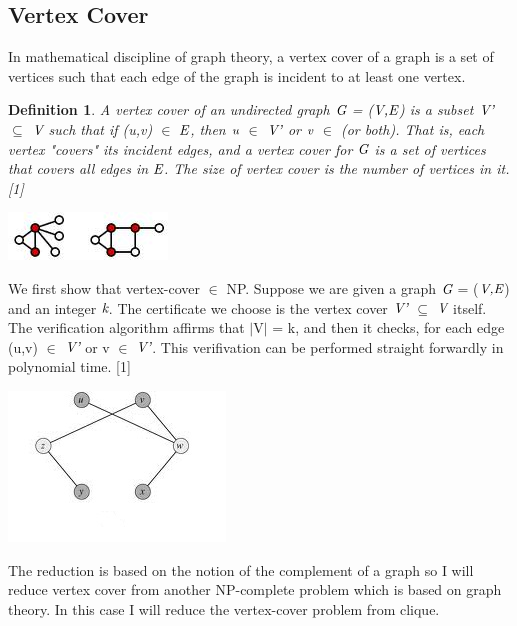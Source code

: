 \documentclass[a4paper]{report}
\newtheorem{defi}{Definition}
\begin{document}
\subsection{Vertex Cover }
In mathematical discipline of graph theory, a vertex cover of a graph is a set of vertices such that each edge of the graph is incident to at least one vertex.

\begin{defi}
A vertex cover of an undirected graph $\emph{G}$ = ($\emph{V,E}$) is a subset $\emph{V'}$ $\subseteq$ $\emph{V}$ such that if (u,v) $\in$ $\emph{E}$, then $\emph{u}$ $\in$ $\emph{V'}$ or $\emph{v}$ $\in$ (or both). That is, each vertex "covers" its incident edges, and a vertex cover for $\emph{G}$ is a set of vertices that covers all edges in $\emph{E}$. The size of vertex cover is the number of vertices in it. [1]
\end{defi}

\begin{center}
\includegraphics[scale=1.11]{vertex1.png}
\end{center}

We first show that vertex-cover $\in$ NP. Suppose we are given a graph $\emph{G}$ = ($\emph{V,E}$) and an integer $\emph{k}$. The certificate we choose is the vertex cover $\emph{V'}$ $\subseteq$ $\emph{V}$ itself. The verification algorithm affirms that $\vert$V$\vert$ = k, and then it checks, for each edge (u,v) $\in$ $\emph{V'}$ or v $\in$ $\emph{V'}$. This verifivation can be performed straight forwardly in polynomial time. [1]

\begin{center}
\includegraphics[scale=0.90]{vertex.png}
\end{center}

The reduction is based on the notion of the complement of a graph so I will reduce vertex cover from another NP-complete problem which is based on graph theory. In this case I will reduce the vertex-cover problem from clique.
\end{document}
